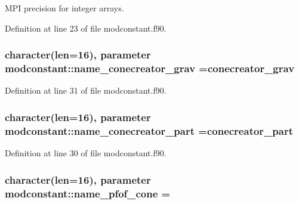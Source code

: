 M\+PI precision for integer arrays. 



Definition at line 23 of file modconstant.\+f90.

\subsubsection[{\texorpdfstring{name\+\_\+conecreator\+\_\+grav}{name_conecreator_grav}}]{\setlength{\rightskip}{0pt plus 5cm}character(len=16), parameter modconstant\+::name\+\_\+conecreator\+\_\+grav =\textquotesingle{}conecreator\+\_\+grav\textquotesingle{}}\hypertarget{namespacemodconstant_ad761f8ece8de325d4dc3d9cb425fedc5}{}\label{namespacemodconstant_ad761f8ece8de325d4dc3d9cb425fedc5}


Definition at line 31 of file modconstant.\+f90.

\subsubsection[{\texorpdfstring{name\+\_\+conecreator\+\_\+part}{name_conecreator_part}}]{\setlength{\rightskip}{0pt plus 5cm}character(len=16), parameter modconstant\+::name\+\_\+conecreator\+\_\+part =\textquotesingle{}conecreator\+\_\+part\textquotesingle{}}\hypertarget{namespacemodconstant_a6afcef14340a8cd5b8736b89385ab062}{}\label{namespacemodconstant_a6afcef14340a8cd5b8736b89385ab062}


Definition at line 30 of file modconstant.\+f90.

\subsubsection[{\texorpdfstring{name\+\_\+pfof\+\_\+cone}{name_pfof_cone}}]{\setlength{\rightskip}{0pt plus 5cm}character(len=16), parameter modconstant\+::name\+\_\+pfof\+\_\+cone =\textquotesingle{}}\hypertarget{namespacemodconstant_a7fbb091f14c29c3ca972099325219e3c}{}\label{namespacemodconstant_a7fbb091f14c29c3ca972099325219e3c}


